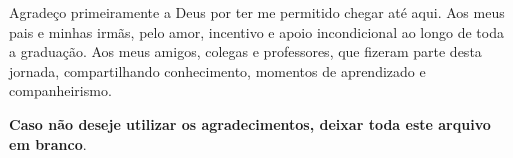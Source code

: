 \begin{agradecimentos}


Agradeço primeiramente a Deus por ter me permitido chegar até aqui. Aos meus 
pais e minhas irmãs, pelo amor, incentivo e apoio incondicional ao longo de toda
a graduação. Aos meus amigos, colegas e professores, que fizeram parte desta 
jornada, compartilhando conhecimento, momentos de aprendizado e companheirismo.

\textbf{Caso não deseje utilizar os agradecimentos, deixar toda este arquivo
em branco}.
\end{agradecimentos}
